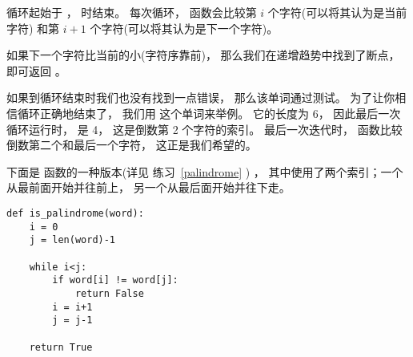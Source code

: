 
循环起始于  ，  时结束。
每次循环， 函数会比较第 $i$ 个字符(可以将其认为是当前字符)
和第 $i+1$ 个字符(可以将其认为是下一个字符)。


如果下一个字符比当前的小(字符序靠前)，
那么我们在递增趋势中找到了断点， 即可返回  。


如果到循环结束时我们也没有找到一点错误， 那么该单词通过测试。
为了让你相信循环正确地结束了， 我们用  这个单词来举例。
它的长度为 6， 因此最后一次循环运行时，  是 4， 这是倒数第 2 个字符的索引。
最后一次迭代时， 函数比较倒数第二个和最后一个字符， 这正是我们希望的。


下面是  函数的一种版本(详见 练习~\ref{palindrome} )
， 其中使用了两个索引；一个从最前面开始并往前上， 另一个从最后面开始并往下走。

\begin{lstlisting}
def is_palindrome(word):
    i = 0
    j = len(word)-1

    while i<j:
        if word[i] != word[j]:
            return False
        i = i+1
        j = j-1

    return True
\end{lstlisting}


